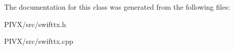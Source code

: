 The documentation for this class was generated from the following files\+:\begin{DoxyCompactItemize}
\item 
P\+I\+V\+X/src/swifttx.\+h\item 
P\+I\+V\+X/src/swifttx.\+cpp\end{DoxyCompactItemize}

